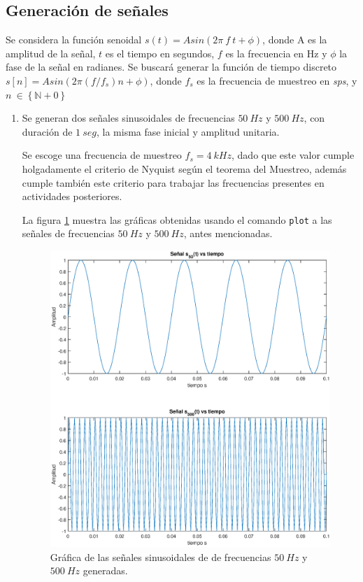 
\subsection{Generación de señales}

Se considera la función senoidal $s(t) = Asin(2\pi ~f~t + \phi)$, donde A es la amplitud de la señal, $t$ es el tiempo en segundos, $f$ es la frecuencia en Hz y $\phi$ la fase de la señal en radianes. Se buscará generar la función de tiempo discreto $s[n] = Asin(2\pi (f/f_s)n + \phi)$, donde $f_s$ es la frecuencia de muestreo en \textit{sps},  y $n~\in \left\lbrace \mathbb{N} + 0 \right\rbrace\ $

\begin{enumerate}
    \item Se generan dos señales sinusoidales de frecuencias $50~Hz$ y $500~Hz$, con duración de $1~seg$, la misma fase inicial y amplitud unitaria.
    
    Se escoge una frecuencia de muestreo $f_s = 4~kHz$, dado que este valor cumple holgadamente el criterio de Nyquist según el teorema del Muestreo, además cumple también este criterio para trabajar las frecuencias presentes en actividades posteriores.
    
    La figura \ref{s50_s500} muestra las gráficas obtenidas usando el comando \texttt{plot} a las señales  de frecuencias $50~Hz$ y $500~Hz$, antes mencionadas.
    
    \begin{figure}[H]
        \centering
        \includegraphics[scale = 0.6]{Imagenes/s50_s500.eps}
        \caption{Gráfica de las señales sinusoidales de  de frecuencias $50~Hz$ y $500~Hz$ generadas.}
        \label{s50_s500}
    \end{figure}
    

\end{enumerate}
